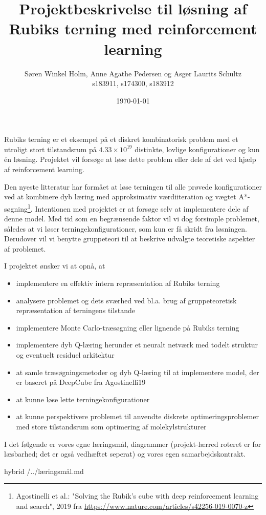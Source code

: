 \documentclass[12pt,fleqn,]{article}
\title{Projektbeskrivelse til løsning af Rubiks terning med reinforcement learning}
\author{Søren Winkel Holm, Anne Agathe Pedersen og Asger Laurits Schultz\\
s183911, s174300, s183912}
\date{\today}
\begin{document}
\maketitle
\noindent
Rubiks terning er et eksempel på et diskret kombinatorisk problem med et utroligt stort tilstandsrum på $4.33\times 10^{19}$ distinkte, lovlige konfigurationer og kun én løsning. 
Projektet vil forsøge at løse dette problem eller dele af det ved hjælp af reinforcement learning. 

Den nyeste litteratur har formået at løse terningen til alle prøvede konfigurationer ved at kombinere dyb læring med approksimativ værdiiteration og vægtet A*-søgning\footnote{Agostinelli et al.: "Solving the Rubik’s cube with deep reinforcement learning and search", 2019 fra
	\url{https://www.nature.com/articles/s42256-019-0070-z}
}.
Intentionen med projektet er at forsøge selv at implementere dele af denne model. 
Med tid som en begrænsende faktor vil vi dog forsimple problemet, således at vi løser terningekonfigurationer, som kun er få skridt fra løsningen.
Derudover vil vi benytte gruppeteori til at beskrive udvalgte teoretiske aspekter af problemet.

I projektet ønsker vi at opnå, at
\begin{itemize}
	\item implementere en effektiv intern repræsentation af Rubiks terning
	\item analysere problemet og dets sværhed ved bl.a. brug af gruppeteoretisk repræsentation af terningens tilstande
	\item implementere Monte Carlo-træsøgning eller lignende på Rubiks terning
	\item implementere dyb Q-læring herunder et neuralt netværk med todelt struktur og eventuelt residuel arkitektur
	\item at samle træsøgningsmetoder og dyb Q-læring til at implementere model, der er baseret på DeepCube fra Agostinelli19
	\item at kunne løse lette terningekonfigurationer
	\item at kunne perspektivere problemet til anvendte diskrete optimeringsproblemer med store tilstandsrum som optimering af molekylstrukturer
\end{itemize}
I det følgende er vores egne læringsmål, diagrammer (projekt-lærred roteret er for læsbarhed; det er også vedhæftet seperat) og vores egen samarbejdskontrakt.
\newpage
\begin{markdown*}{hybrid}
/../læringsmål.md
\end{markdown*}
\end{document}
